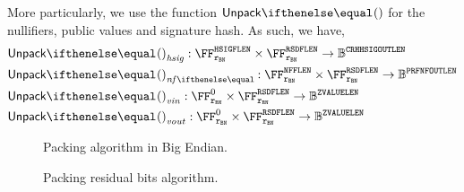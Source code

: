 More particularly, we use the function $\unpack{}{}$ for the nullifiers, public values and signature hash. As such, we have,
\begin{align*}
    &\unpack{}{}_{\hsig} : \FFx{\rBN}^\hsigFLen \times \FFx{\rBN}^{\resBitsFLen} \to \BB^\crhhsigOutLen \\
    &\unpack{}{}_{\nf{}} : \FFx{\rBN}^\nfFLen \times \FFx{\rBN}^{\resBitsFLen} \to \BB^\prfNfOutLen \\
    &\unpack{}{}_{\vin} : \FFx{\rBN}^0 \times \FFx{\rBN}^{\resBitsFLen} \to \BB^\zvalueLen \\
    &\unpack{}{}_{\vout} : \FFx{\rBN}^0 \times \FFx{\rBN}^{\resBitsFLen} \to \BB^\zvalueLen
\end{align*}

\begin{figure*}
    \begin{minipage}[t]{.4\textwidth}
        \centering
        \caption{Packing algorithm in Big Endian.}\label{zeth-protocol:fig:packing-alg}
    \end{minipage}%
    \begin{minipage}[t]{.6\textwidth}
        \centering
        \caption{Packing residual bits algorithm.}\label{zeth-protocol:fig:packing-resbits-alg}
    \end{minipage}
\end{figure*}

